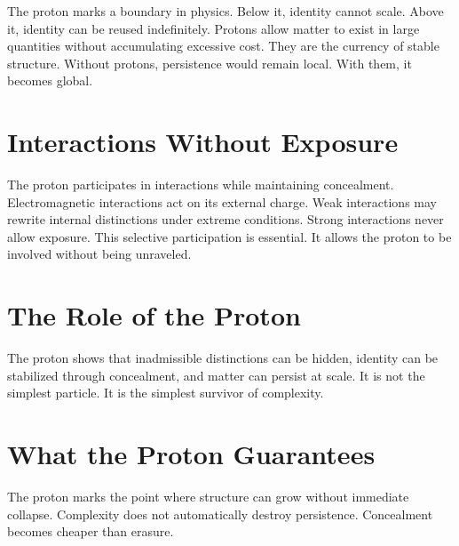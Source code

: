 \documentclass[11pt,twoside,openright]{book}
\begin{document}
The proton marks a boundary in physics. Below it, identity cannot scale. Above it, identity can be reused indefinitely. Protons allow matter to exist in large quantities without accumulating excessive cost. They are the currency of stable structure. Without protons, persistence would remain local. With them, it becomes global.

\section*{Interactions Without Exposure}

The proton participates in interactions while maintaining concealment. Electromagnetic interactions act on its external charge. Weak interactions may rewrite internal distinctions under extreme conditions. Strong interactions never allow exposure. This selective participation is essential. It allows the proton to be involved without being unraveled.

\section*{The Role of the Proton}

The proton shows that inadmissible distinctions can be hidden, identity can be stabilized through concealment, and matter can persist at scale. It is not the simplest particle. It is the simplest survivor of complexity.

\section*{What the Proton Guarantees}

The proton marks the point where structure can grow without immediate collapse. Complexity does not automatically destroy persistence. Concealment becomes cheaper than erasure.
\end{document}

